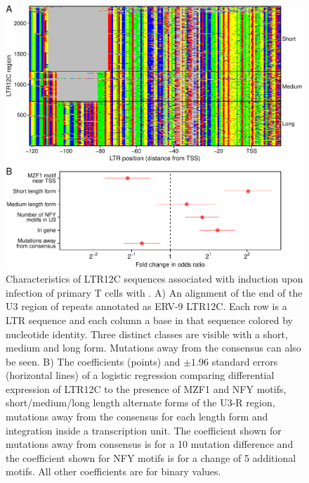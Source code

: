 \documentclass[../sherrill-Mix_thesis.tex]{subfiles}
\begin{document}
		\begin{figure}
			\centering
				\includegraphics[width=\textwidth]{ltr12c.pdf}
			\caption[Characteristics of LTR12C sequences associated with induction upon infection with \hivEight{}]{Characteristics of LTR12C sequences associated with induction upon infection of primary T cells with \hivEight{}.  A) An alignment of the \threePrime{} end of the U3 region of repeats annotated as ERV-9 LTR12C. Each row is a LTR sequence and each column a base in that sequence colored by nucleotide identity. Three distinct classes are visible with a short, medium and long form. Mutations away from the consensus can also be seen. B)  The coefficients (points) and $\pm 1.96$ standard errors (horizontal lines) of a logistic regression comparing differential expression of LTR12C to the presence of MZF1 and NFY motifs, short/medium/long length alternate forms of the U3-R region, mutations away from the consensus for each length form and integration inside a transcription unit. The coefficient shown for mutations away from consensus is for a 10 mutation difference and the coefficient shown for NFY motifs is for a change of 5 additional motifs. All other coefficients are for binary values.}
			\label{figLtr12c}
		\end{figure}
\end{document}
